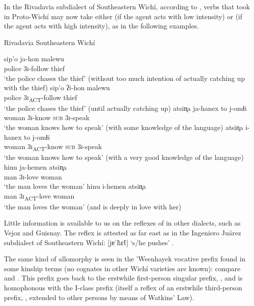 In the Rivadavia subdialect of Southeastern Wichí, according to \citet[134–135]{JT09-th}, verbs that took  in Proto-Wichí may now take either  (if the agent acts with low intensity) or  (if the agent acts with high intensity), as in the following examples.

\newpage
\ea
Rivadavia Southeastern Wichí \citep[135]{JT09-th}\\
    \begin{xlist}
        \ex\gll sip’o ja-hon malewu\\
                police 3{\textsc{i}}-follow thief\\
                \glt `the police chases the thief' (without too much intention of actually catching up with the thief)
        \ex\gll sip’o ʔi-hon malewu\\
                police 3{\textsc{i}}\textsubscript{ACT}-follow thief\\
                \glt `the police chases the thief' (until actually catching up)
        \ex\gll atsin̥a ja-hanex to j-omɬi\\
                woman 3{\textsc{i}}-know {\textsc{sub}} 3{\textsc{i}}-speak\\
                \glt `the woman knows how to speak' (with some knowledge of the language)
        \ex\gll atsin̥a i-hanex to j-omɬi\\
                woman 3{\textsc{i}}\textsubscript{ACT}-know  {\textsc{sub}} 3{\textsc{i}}-speak\\
                \glt `the woman knows how to speak' (with a very good knowledge of the language)
        \ex\gll hinu ja-hemen atsin̥a\\
                man 3{\textsc{i}}-love woman\\
                \glt `the man loves the woman'
        \ex\gll hinu i-hemen atsin̥a\\
                man 3{\textsc{i}}\textsubscript{ACT}-love woman\\
                \glt `the man loves the woman' (and is deeply in love with her)
    \end{xlist}
\z

Little information is available to us on the reflexes of  in other dialects, such as Vejoz and Guisnay. The reflex  is attested as far east as in the Ingeniero Juárez subdialect of Southeastern Wichí: [jɐˈh̃ɛ̃t] `s/he pushes' \citep[100]{LCB-MBC09}.

The same kind of allomorphy is seen in the ’Weenhayek vocative prefix found in some kinship terms (no cognates in other Wichí varieties are known): compare  and  \citep[445]{JAA-KC-14}. This prefix goes back to the erstwhile first-person singular prefix, , and is homophonous with the I-class prefix (itself a reflex of an erstwhile third-person prefix, , extended to other persons by means of Watkins’ Law).

